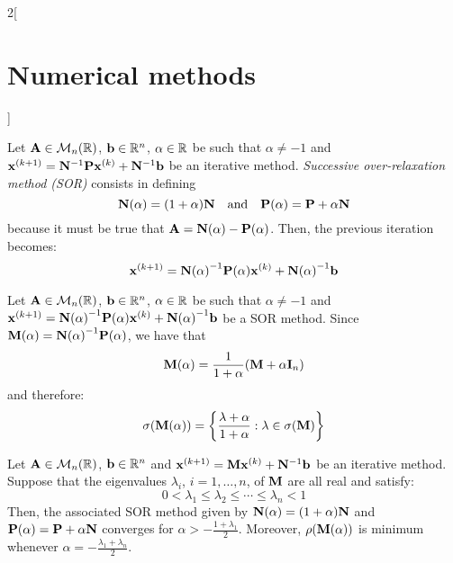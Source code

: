 \documentclass[../../../main.tex]{subfiles}
\begin{document}
\begin{multicols}{2}[\section{Numerical methods}]
\begin{method}
    \end{method}
    \begin{method}
        Let $\vb{A}\in\mathcal{M}_n(\mathbb{R})$, $\vb{b}\in\mathbb{R}^n$, $\alpha\in\mathbb{R}$ be such that $\alpha\ne-1$ and $\vb{x}^{(k+1)}=\vb{N}^{-1}\vb{P}\vb{x}^{(k)}+\vb{N}^{-1}\vb{b}$ be an iterative method. \textit{Successive over-relaxation method (SOR)} consists in defining $$\vb{N}(\alpha)=(1+\alpha)\vb{N}\quad\text{and}\quad\vb{P}(\alpha)=\vb{P}+\alpha\vb{N}$$ because it must be true that $\vb{A}=\vb{N}(\alpha)-\vb{P}(\alpha)$. Then, the previous iteration becomes: $$\vb{x}^{(k+1)}={\vb{N}(\alpha)}^{-1}\vb{P}(\alpha)\vb{x}^{(k)}+{\vb{N}(\alpha)}^{-1}\vb{b}$$
    \end{method}
    \begin{definition}
        Let $\vb{A}\in\mathcal{M}_n(\mathbb{R})$, $\vb{b}\in\mathbb{R}^n$, $\alpha\in\mathbb{R}$ be such that $\alpha\ne-1$ and $\vb{x}^{(k+1)}={\vb{N}(\alpha)}^{-1}\vb{P}(\alpha)\vb{x}^{(k)}+{\vb{N}(\alpha)}^{-1}\vb{b}$ be a SOR method. Since $\vb{M}(\alpha)={\vb{N}(\alpha)}^{-1}\vb{P}(\alpha)$, we have that $$\vb{M}(\alpha)=\frac{1}{1+\alpha}(\vb{M}+\alpha\vb{I}_n)$$ and therefore: $$\sigma(\vb{M}(\alpha))=\left\{\frac{\lambda+\alpha}{1+\alpha}:\lambda\in\sigma(\vb{M})\right\}$$
    \end{definition}
    \begin{theorem}
        Let $\vb{A}\in\mathcal{M}_n(\mathbb{R})$, $\vb{b}\in\mathbb{R}^n$ and $\vb{x}^{(k+1)}=\vb{M}\vb{x}^{(k)}+\vb{N}^{-1}\vb{b}$ be an iterative method. Suppose that the eigenvalues $\lambda_i$, $i=1,\ldots,n$, of $\vb{M}$ are all real and satisfy: $$0<\lambda_1\leq\lambda_2\leq\cdots\leq\lambda_n<1$$
        Then, the associated SOR method given by $\vb{N}(\alpha)=(1+\alpha)\vb{N}$ and $\vb{P}(\alpha)=\vb{P}+\alpha\vb{N}$ converges for $\alpha>-\frac{1+\lambda_1}{2}$. Moreover, $\rho(\vb{M}(\alpha))$ is minimum whenever $\alpha=-\frac{\lambda_1+\lambda_n}{2}$.
    \end{theorem}

\end{multicols}
\end{document}
